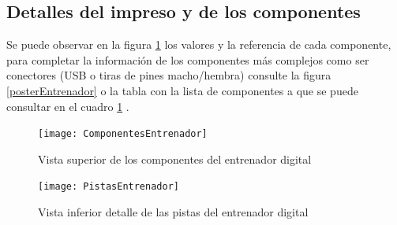 \subsection{Detalles del impreso y de los componentes}
Se puede observar en la figura \ref{ComponentesEntrenador} los valores y la referencia de cada componente, para completar la información de los componentes más complejos como ser conectores (USB o tiras de pines macho/hembra) consulte la figura \ref{posterEntrenador} o la tabla con la lista de componentes a que se puede consultar en el cuadro \ref{ComponentesEntrenador} . 
\begin{figure}[H]
	\centering\texttt{[image: ComponentesEntrenador]}	\caption{Vista superior de los componentes del entrenador digital}\label{ComponentesEntrenador}
\end{figure}%
\begin{figure}[H]
	\centering\texttt{[image: PistasEntrenador]}	\caption{Vista inferior detalle de las pistas del entrenador digital}\label{PistaEntrenador}
\end{figure}%
